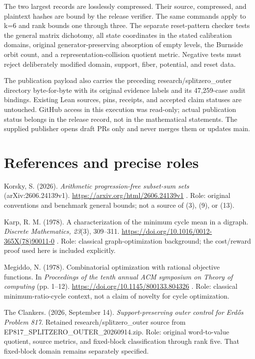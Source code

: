 The two largest records are losslessly compressed. Their source, compressed, and plaintext hashes are bound by the release verifier. The same commands apply to k=6 and rank bounds one through three. The separate reset-pattern checker tests the general matrix dichotomy, all state coordinates in the stated calibration domains, original generator-preserving absorption of empty levels, the Burnside orbit count, and a representation-collision quotient metric. Negative tests must reject deliberately modified domain, support, fiber, potential, and reset data.

The publication payload also carries the preceding research/splitzero\_outer directory byte-for-byte with its original evidence labels and its 47,259-case audit bindings. Existing Lean sources, pins, receipts, and accepted claim statuses are untouched. GitHub access in this execution was read-only; actual publication status belongs in the release record, not in the mathematical statements. The supplied publisher opens draft PRs only and never merges them or updates main.

\section{References and precise roles}\label{n07-references-and-precise-roles}

Korsky, S. (2026). \emph{Arithmetic progression-free subset-sum sets} (arXiv:2606.24139v1). \url{https://arxiv.org/html/2606.24139v1} . Role: original conventions and benchmark general bounds; not a source of (3), (9), or (13).

Karp, R. M. (1978). A characterization of the minimum cycle mean in a digraph. \emph{Discrete Mathematics, 23}(3), 309--311. \url{https://doi.org/10.1016/0012-365X(78)90011-0} . Role: classical graph-optimization background; the cost/reward proof used here is included explicitly.

Megiddo, N. (1978). Combinatorial optimization with rational objective functions. In \emph{Proceedings of the tenth annual ACM symposium on Theory of computing} (pp. 1--12). \url{https://doi.org/10.1145/800133.804326} . Role: classical minimum-ratio-cycle context, not a claim of novelty for cycle optimization.

The Clankers. (2026, September 14). \emph{Support-preserving outer control for Erdős Problem 817}. Retained research/splitzero\_outer source from EP817\_SPLITZERO\_OUTER\_20260914.zip. Role: original word-to-value quotient, source metrics, and fixed-block classification through rank five. That fixed-block domain remains separately specified.

